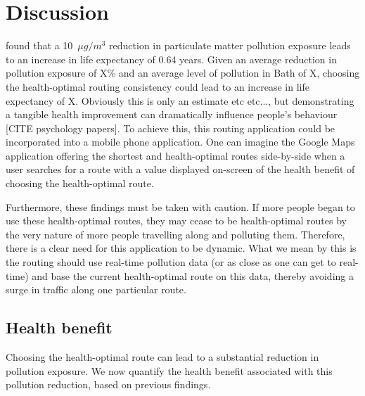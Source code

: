 \documentclass[11pt]{report}
\begin{document}
\section{Discussion}

\cite{Ebenstein2017lifeexpectancy} found that a 10~$\mu g/m^3$ reduction in particulate matter pollution exposure leads to an increase in life expectancy of 0.64 years. Given an average reduction in pollution exposure of X\% and an average level of pollution in Bath of X, choosing the health-optimal routing consistency could lead to an increase in life expectancy of X. Obviously this is only an estimate etc etc..., but demonstrating a tangible health improvement can dramatically influence people's behaviour [CITE psychology papers]. To achieve this, this routing application could be incorporated into a mobile phone application. One can imagine the Google Maps application offering the shortest and health-optimal routes side-by-side when a user searches for a route with a value displayed on-screen of the health benefit of choosing the health-optimal route.

Furthermore, these findings must be taken with caution. If more people began to use these health-optimal routes, they may cease to be health-optimal routes by the very nature of more people travelling along and polluting them. Therefore, there is a clear need for this application to be dynamic. What we mean by this is the routing should use real-time pollution data (or as close as one can get to real-time) and base the current health-optimal route on this data, thereby avoiding a surge in traffic along one particular route.

\subsection{Health benefit}


Choosing the health-optimal route can lead to a substantial reduction in pollution exposure. We now quantify the health benefit associated with this pollution reduction, based on previous findings.



\end{document}
